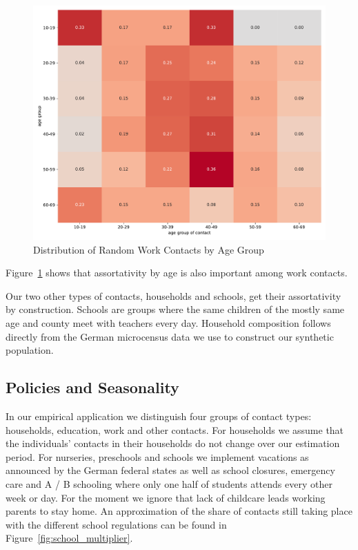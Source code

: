\begin{figure}[ht]
    \centering
    \includegraphics[width=0.9 \textwidth]{figures/results/figures/data/assortativity_work_non_recurrent}
    \caption{Distribution of Random Work Contacts by Age Group}
    \label{fig:assortativity_work}
\end{figure}

Figure~\ref{fig:assortativity_work} shows that assortativity by age is also important
among work contacts.

Our two other types of contacts, households and schools, get their assortativity by
construction. Schools are groups where the same children of the mostly same age and
county meet with teachers every day. Household composition follows directly from the
German microcensus data we use to construct our synthetic population.

\FloatBarrier

\subsection{Policies and Seasonality}
\label{subsec:policies_seasonality}


In our empirical application we distinguish four groups
of contact types: households, education, work and other contacts.%
For households we assume that the individuals'
contacts in their households do not change over our estimation period.
For nurseries, preschools and schools we implement vacations as announced by the German
federal states as well as school closures, emergency care and A / B schooling where only
one half of students attends every other week or day. For the moment we ignore that lack
of childcare leads working parents to stay home. An approximation of the share of contacts still taking place with the different school regulations can be found in Figure~\ref{fig:school_multiplier}.

